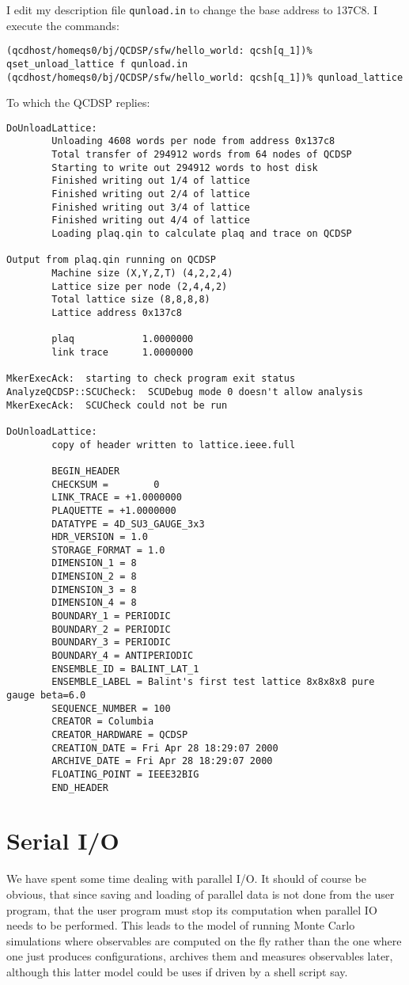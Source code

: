 I edit my description file {\tt qunload.in} to change the base address to 137C8.
I execute the commands: {\scriptsize
\begin{verbatim}
(qcdhost/homeqs0/bj/QCDSP/sfw/hello_world: qcsh[q_1])% qset_unload_lattice f qunload.in
(qcdhost/homeqs0/bj/QCDSP/sfw/hello_world: qcsh[q_1])% qunload_lattice
\end{verbatim}}
To which the QCDSP replies:
{\scriptsize
\begin{verbatim}
DoUnloadLattice:
        Unloading 4608 words per node from address 0x137c8
        Total transfer of 294912 words from 64 nodes of QCDSP
        Starting to write out 294912 words to host disk
        Finished writing out 1/4 of lattice
        Finished writing out 2/4 of lattice
        Finished writing out 3/4 of lattice
        Finished writing out 4/4 of lattice
        Loading plaq.qin to calculate plaq and trace on QCDSP

Output from plaq.qin running on QCDSP
        Machine size (X,Y,Z,T) (4,2,2,4)
        Lattice size per node (2,4,4,2)
        Total lattice size (8,8,8,8)
        Lattice address 0x137c8

        plaq            1.0000000
        link trace      1.0000000

MkerExecAck:  starting to check program exit status
AnalyzeQCDSP::SCUCheck:  SCUDebug mode 0 doesn't allow analysis
MkerExecAck:  SCUCheck could not be run

DoUnloadLattice:
        copy of header written to lattice.ieee.full

        BEGIN_HEADER
        CHECKSUM =        0
        LINK_TRACE = +1.0000000
        PLAQUETTE = +1.0000000
        DATATYPE = 4D_SU3_GAUGE_3x3
        HDR_VERSION = 1.0
        STORAGE_FORMAT = 1.0
        DIMENSION_1 = 8
        DIMENSION_2 = 8
        DIMENSION_3 = 8
        DIMENSION_4 = 8
        BOUNDARY_1 = PERIODIC
        BOUNDARY_2 = PERIODIC
        BOUNDARY_3 = PERIODIC
        BOUNDARY_4 = ANTIPERIODIC
        ENSEMBLE_ID = BALINT_LAT_1
        ENSEMBLE_LABEL = Balint's first test lattice 8x8x8x8 pure gauge beta=6.0
        SEQUENCE_NUMBER = 100
        CREATOR = Columbia
        CREATOR_HARDWARE = QCDSP 
        CREATION_DATE = Fri Apr 28 18:29:07 2000
        ARCHIVE_DATE = Fri Apr 28 18:29:07 2000
        FLOATING_POINT = IEEE32BIG
        END_HEADER
\end{verbatim}
}

\section{Serial I/O}
We have spent some time dealing with parallel I/O. It should of course
be obvious, that since saving and loading of parallel data is not done
from the user program, that the user program must stop its computation
when parallel IO needs to be performed. This leads to the model of running
Monte Carlo simulations where observables are computed on the fly rather
than the one where one just produces configurations, archives them 
and measures observables later, although this latter model could be 
uses if driven by a shell script say.

